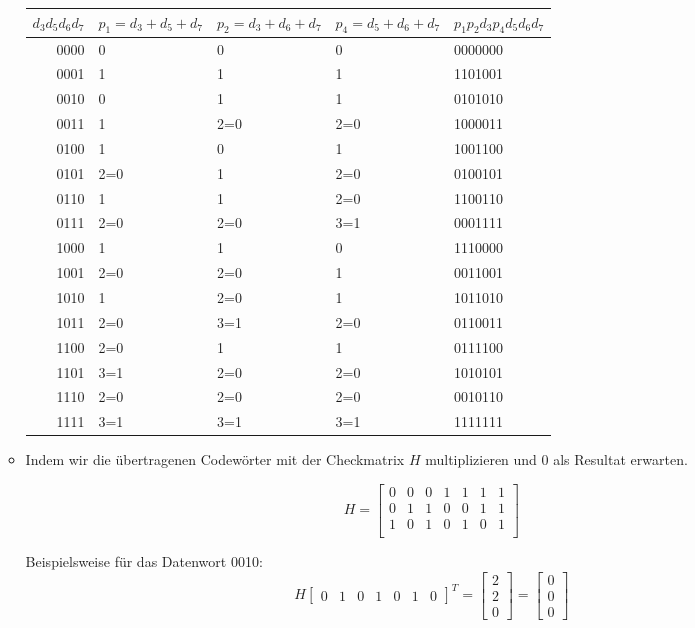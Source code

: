 \documentclass[11pt]{article} %
\theoremstyle{definition}
\begin{document}
\begin{enumerate}[1.]
\begin{itemize}
\begin{tabular}{r||l|l|l||l}
$d_3d_5d_6d_7$ & $p_1 = d_3+d_5+d_7$ & $p_2=d_3+d_6+d_7$ & $p_4=d_5+d_6+d_7$ & $p_1p_2d_3p_4d_5d_6d_7$ \\\hline
0000 & 0 & 0 & 0 & 0000000 \\
0001 & 1 & 1 & 1 & 1101001 \\
0010 & 0 & 1 & 1 & 0101010 \\
0011 & 1 & 2=0 &2=0 & 1000011 \\
0100 & 1 & 0 &1 & 1001100 \\
0101 & 2=0 & 1 &2=0 & 0100101 \\
0110 & 1 & 1 &2=0 & 1100110 \\
0111 & 2=0 & 2=0  &3=1 & 0001111 \\
1000 & 1 & 1 &0 & 1110000 \\
1001 & 2=0 & 2=0 &1 & 0011001 \\
1010 & 1 & 2=0 &1 & 1011010 \\
1011 & 2=0 &3=1 &2=0 &0110011 \\
1100 & 2=0 &1 &1 & 0111100 \\
1101 & 3=1 &2=0 &2=0 & 1010101 \\
1110 & 2=0 &2=0 &2=0 & 0010110 \\
1111 & 3=1 &3=1 &3=1 & 1111111 \\
\end{tabular}

\item Indem wir die übertragenen Codewörter mit der Checkmatrix $H$ multiplizieren und 0 als Resultat erwarten.

\[
H = \begin{bmatrix}
0 & 0 & 0 & 1 & 1 & 1 & 1 \\
0 & 1 & 1 & 0 & 0 & 1 & 1 \\
1 & 0 & 1 & 0 & 1 & 0 & 1 \\
\end{bmatrix}
\]

Beispielsweise für das Datenwort 0010:
\[
H \begin{bmatrix}
0 & 1 & 0 & 1 & 0 & 1 & 0
\end{bmatrix}^T = \begin{bmatrix} 2 \\ 2 \\ 0 \end{bmatrix} = \begin{bmatrix} 0 \\ 0 \\ 0\end{bmatrix}
\]


\end{itemize}
\end{enumerate}
\end{document}
